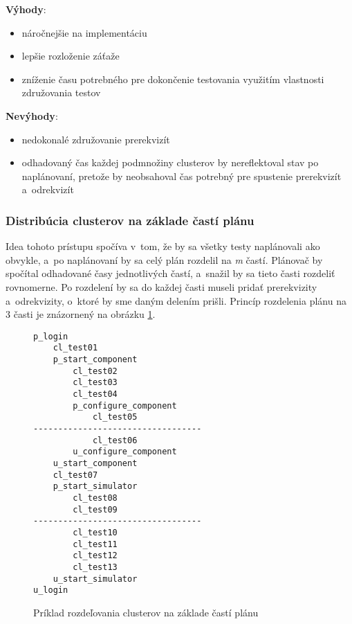 \noindent \textbf{Výhody}:
\begin{itemize}
\item náročnejšie na implementáciu
\item lepšie rozloženie záťaže
\item zníženie času potrebného pre dokončenie testovania využitím vlastnosti združovania testov
\end{itemize} 

\noindent \textbf{Nevýhody}:
\begin{itemize}
\item nedokonalé združovanie prerekvizít 
\item odhadovaný čas každej podmnožiny clusterov by nereflektoval stav po naplánovaní, pretože by
neobsahoval čas potrebný pre spustenie prerekvizít a~odrekvizít
\end{itemize}

\subsubsection*{Distribúcia clusterov na základe častí plánu}
Idea tohoto prístupu spočíva v~tom, že by sa všetky testy naplánovali ako obvykle, a~po naplánovaní by sa
celý plán rozdelil na \emph{m} častí. Plánovač by spočítal odhadované časy jednotlivých častí, a~snažil by sa tieto časti
rozdeliť rovnomerne. Po rozdelení by sa do každej časti museli pridať prerekvizity a~odrekvizity, o~ktoré
by sme daným delením prišli. Princíp rozdelenia plánu na 3 časti je znázornený na obrázku \ref{obrazok:distribucia_na_casti}.
\begin{figure}[h]
\begin{lstlisting}
p_login
    cl_test01
    p_start_component
        cl_test02
        cl_test03
        cl_test04
        p_configure_component
            cl_test05
----------------------------------
            cl_test06
        u_configure_component
    u_start_component
    cl_test07
    p_start_simulator
        cl_test08
        cl_test09
----------------------------------
        cl_test10
        cl_test11
        cl_test12
        cl_test13
    u_start_simulator
u_login
\end{lstlisting}
\caption{Príklad rozdeľovania clusterov na základe častí plánu}
\label{obrazok:distribucia_na_casti}
\end{figure}

